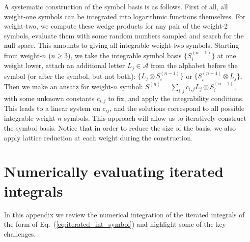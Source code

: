 \documentclass[a4paper,11pt]{article}
\begin{document}
A systematic construction of the symbol basis is as follows. First of all, all weight-one symbols can be integrated into logarithmic functions themselves. For weight-two, we compute these wedge products for any pair of the weight-2 symbols, evaluate them with some random numbers sampled and search for the null space. This amounts to giving all integrable weight-two symbols. Starting from weight-$n$ ($n\geq 3$), we take the integrable symbol basis $\{S^{(n-1)}_i\}$ at one weight lower, attach an additional letter $L_j\in \mathcal{A}$ from the alphabet before the symbol (or after the symbol, but not both): $\{L_j\otimes S^{(n-1)}_i\}$ or $\{S^{(n-1)}_i\otimes L_j\}$. Then we make an ansatz for weight-$n$ symbol: $S^{(n)}=\sum_{i,j}c_{i,j}L_j\otimes S^{(n-1)}_i$, with some unknown constants $c_{i,j}$ to fix, and apply the integrability conditions. This leads to a linear system on $c_{ij}$, and the solutions correspond to all possible integrable weight-$n$ symbols. This approach will allow us to iteratively construct the symbol basis. Notice that in order to reduce the size of the basis, we also apply lattice reduction at each weight during the construction. 

\section{Numerically evaluating iterated integrals}\label{sec:app_iterated_integrals}
In this appendix we review the numerical integration of the iterated integrals of the form of Eq.~(\ref{eq:iterated_int_symbol}) and highlight some of the key challenges. 
\end{document}
